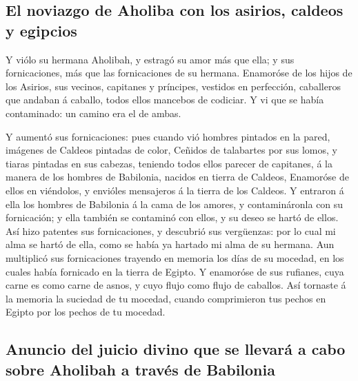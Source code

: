\hypertarget{el-noviazgo-de-aholiba-con-los-asirios-caldeos-y-egipcios}{%
\subsection{El noviazgo de Aholiba con los asirios, caldeos y
egipcios}\label{el-noviazgo-de-aholiba-con-los-asirios-caldeos-y-egipcios}}

 Y viólo su hermana Aholibah, y estragó su amor más que
ella; y sus fornicaciones, más que las fornicaciones de su hermana.
 Enamoróse de los hijos de los Asirios, sus vecinos,
capitanes y príncipes, vestidos en perfección, caballeros que andaban á
caballo, todos ellos mancebos de codiciar.  Y vi que se
había contaminado: un camino era el de ambas.

 Y aumentó sus fornicaciones: pues cuando vió hombres
pintados en la pared, imágenes de Caldeos pintadas de color,
 Ceñidos de talabartes por sus lomos, y tiaras pintadas
en sus cabezas, teniendo todos ellos parecer de capitanes, á la manera
de los hombres de Babilonia, nacidos en tierra de Caldeos,
 Enamoróse de ellos en viéndolos, y envióles mensajeros á
la tierra de los Caldeos.  Y entraron á ella los hombres
de Babilonia á la cama de los amores, y contamináronla con su
fornicación; y ella también se contaminó con ellos, y su deseo se hartó
de ellos.  Así hizo patentes sus fornicaciones, y
descubrió sus vergüenzas: por lo cual mi alma se hartó de ella, como se
había ya hartado mi alma de su hermana.  Aun multiplicó
sus fornicaciones trayendo en memoria los días de su mocedad, en los
cuales había fornicado en la tierra de Egipto.  Y
enamoróse de sus rufianes, cuya carne es como carne de asnos, y cuyo
flujo como flujo de caballos.  Así tornaste á la memoria
la suciedad de tu mocedad, cuando comprimieron tus pechos en Egipto por
los pechos de tu mocedad.

\hypertarget{anuncio-del-juicio-divino-que-se-llevaruxe1-a-cabo-sobre-aholibah-a-travuxe9s-de-babilonia}{%
\subsection{Anuncio del juicio divino que se llevará a cabo sobre
Aholibah a través de
Babilonia}\label{anuncio-del-juicio-divino-que-se-llevaruxe1-a-cabo-sobre-aholibah-a-travuxe9s-de-babilonia}}

